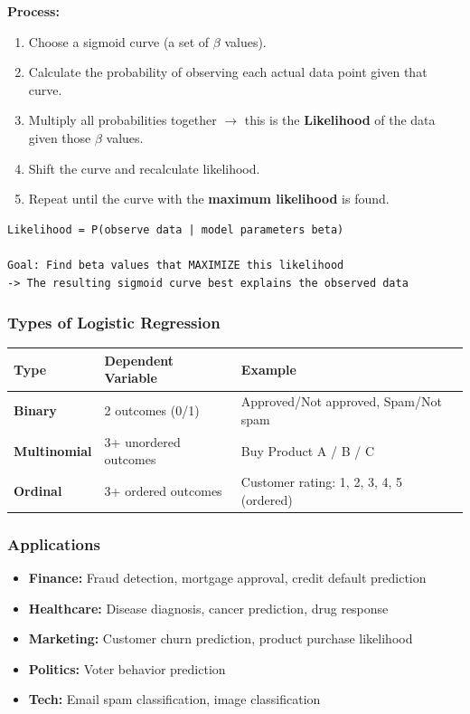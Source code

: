 \documentclass[12pt,openany]{book}
\begin{document}
\textbf{Process:}
\begin{enumerate}[leftmargin=*]
    \item Choose a sigmoid curve (a set of \(\beta\) values).
    \item Calculate the probability of observing each actual data point given that curve.
    \item Multiply all probabilities together \(\rightarrow\) this is the \textbf{Likelihood} of the data given those \(\beta\) values.
    \item Shift the curve and recalculate likelihood.
    \item Repeat until the curve with the \textbf{maximum likelihood} is found.

\end{enumerate}

\begin{Verbatim}[breaklines=true,fontsize=\small]
Likelihood = P(observe data | model parameters beta)

Goal: Find beta values that MAXIMIZE this likelihood
-> The resulting sigmoid curve best explains the observed data
\end{Verbatim}


\subsubsection{Types of Logistic Regression}


\begin{center}
\small
\renewcommand{\arraystretch}{1.15}
\begin{tabular}{|L{0.22\textwidth}|L{0.30\textwidth}|L{0.36\textwidth}|}
\hline
    Type & Dependent Variable & Example \\
\hline
    \textbf{Binary} & 2 outcomes (0/1) & Approved/Not approved, Spam/Not spam \\
\hline
    \textbf{Multinomial} & 3+ unordered outcomes & Buy Product A / B / C \\
\hline
    \textbf{Ordinal} & 3+ ordered outcomes & Customer rating: 1, 2, 3, 4, 5 (ordered) \\
\hline
\end{tabular}
\end{center}
\normalsize


\subsubsection{Applications}


\begin{itemize}[leftmargin=*]
    \item \textbf{Finance:} Fraud detection, mortgage approval, credit default prediction
    \item \textbf{Healthcare:} Disease diagnosis, cancer prediction, drug response
    \item \textbf{Marketing:} Customer churn prediction, product purchase likelihood
    \item \textbf{Politics:} Voter behavior prediction
    \item \textbf{Tech:} Email spam classification, image classification

\end{itemize}
\end{document}
